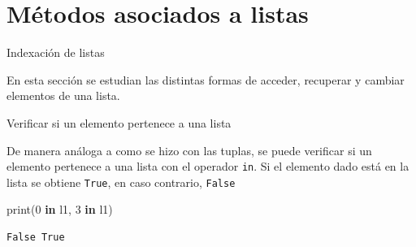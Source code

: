 \documentclass[
  ignorenonframetext,
  aspectratio=169,
  spanish,
]{beamer}
\newenvironment{Shaded}{\begin{snugshade}}{\end{snugshade}}
\newcommand{\BuiltInTok}[1]{\textcolor[rgb]{0.00,0.23,0.31}{#1}}
\newcommand{\DecValTok}[1]{\textcolor[rgb]{0.68,0.00,0.00}{#1}}
\newcommand{\KeywordTok}[1]{\textcolor[rgb]{0.00,0.23,0.31}{\textbf{#1}}}
\newcommand{\NormalTok}[1]{\textcolor[rgb]{0.00,0.23,0.31}{#1}}
\begin{document}
\section{Métodos asociados a
listas}\label{muxe9todos-asociados-a-listas}

\begin{frame}{Indexación de listas}
\label{sec-IndexacionDeLista}

En esta sección se estudian las distintas formas de acceder, recuperar y
cambiar elementos de una lista.
\end{frame}

\begin{frame}[fragile]{Verificar si un elemento pertenece a una lista}
\label{verificar-si-un-elemento-pertenece-a-una-lista}

De manera análoga a como se hizo con las tuplas, se puede verificar si
un elemento pertenece a una lista con el operador \texttt{in}. Si el
elemento dado está en la lista se obtiene \texttt{True}, en caso
contrario, \texttt{False}

\begin{Shaded}
\begin{Highlighting}[]
\BuiltInTok{print}\NormalTok{(}\DecValTok{0} \KeywordTok{in}\NormalTok{ l1, }\DecValTok{3} \KeywordTok{in}\NormalTok{ l1)}
\end{Highlighting}
\end{Shaded}

\begin{verbatim}
False True
\end{verbatim}
\end{frame}
\end{document}
